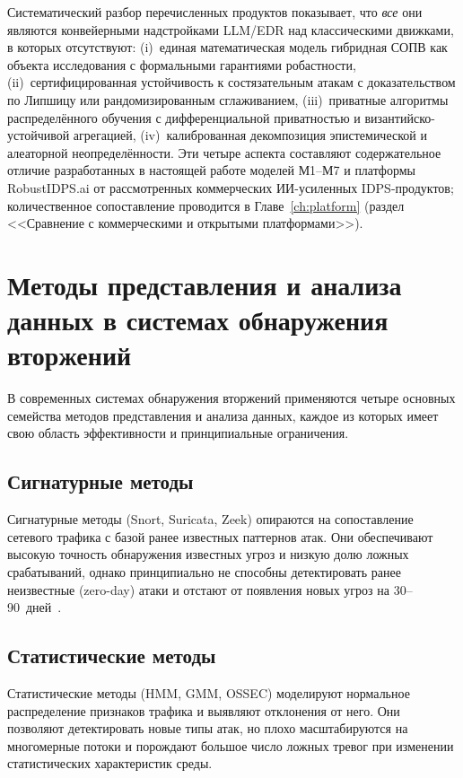 \noindent Систематический разбор перечисленных продуктов
показывает, что \emph{все} они являются конвейерными надстройками
LLM/EDR над классическими движками, в которых отсутствуют:
(i)~единая математическая модель гибридная СОПВ как объекта
исследования с формальными гарантиями робастности,
(ii)~сертифицированная устойчивость к состязательным атакам с
доказательством по Липшицу или рандомизированным сглаживанием,
(iii)~приватные алгоритмы распределённого обучения с
дифференциальной приватностью и византийско-устойчивой
агрегацией, (iv)~калиброванная декомпозиция эпистемической и
алеаторной неопределённости. Эти четыре аспекта составляют
содержательное отличие разработанных в настоящей работе моделей
М1--М7 и платформы RobustIDPS.ai от рассмотренных коммерческих
ИИ-усиленных IDPS-продуктов; количественное сопоставление
проводится в Главе~\ref{ch:platform} (раздел
<<Сравнение с коммерческими и открытыми платформами>>).


\section{Методы представления и анализа данных в системах обнаружения вторжений}
\label{sec:data_representation_methods}

В современных системах обнаружения вторжений применяются четыре основных
семейства методов представления и анализа данных, каждое из которых имеет
свою область эффективности и принципиальные ограничения.

\subsection{Сигнатурные методы}

Сигнатурные методы (Snort, Suricata, Zeek) опираются на сопоставление
сетевого трафика с базой ранее известных паттернов атак. Они обеспечивают
высокую точность обнаружения известных угроз и низкую долю ложных
срабатываний, однако принципиально не способны детектировать ранее
неизвестные (zero-day) атаки и отстают от появления новых угроз на
30--90~дней~\cite{Roesch1999,Paxson1999}.

\subsection{Статистические методы}

Статистические методы (HMM, GMM, OSSEC) моделируют нормальное
распределение признаков трафика и выявляют отклонения от него. Они
позволяют детектировать новые типы атак, но плохо масштабируются на
многомерные потоки и порождают большое число ложных тревог при
изменении статистических характеристик среды.


